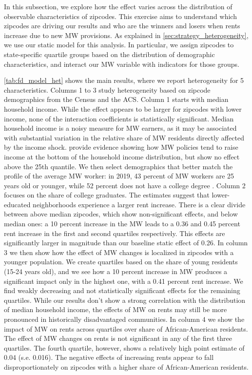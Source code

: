 In this subsection, we explore how the effect varies across the distribution of observable 
characteristics of zipcodes. This exercise aims to understand which zipcodes are driving 
our results and who are the winners and losers when rents increase due to new MW provisions. 
As explained in \autoref{sec:strategy_heterogeneity}, we use our static model for this analysis. 
In particular, we assign zipcodes to state-specific quartile groups based on the distribution of demographic
characteristics, and interact our MW variable with indicators for those groups. 

\autoref{tab:fd_model_het} shows the main results, where we report heterogeneity for 5 
characteristics. Columns 1 to 3 study heterogeneity based on zipcode demographics from the 
Census and the ACS. Column 1 starts with median household income. While the effect appears to 
be larger for zipcodes with lower income, none of the interaction coefficients is statistically 
significant. Median household income is a noisy measure for MW earners, as it may be associated 
with substantial variation in the relative share of MW residents directly affected by the income 
shock. \textcite{dube2019minimum} provide evidence showing how MW policies tend to raise income 
at the bottom of the household income distribution, but show no effect above the 25th quantile. 
We then select demographics that better match the profile of the average MW worker: 
in 2019, 43 percent of MW workers are 25 years old 
or younger, while 52 percent does not have a college degree \parencite{bls2019minworkers}. 
Column 2 focuses on the share of college graduates. The estimates suggest that 
lower-educated neighborhoods experience a larger rent increase. There is a clear divide 
between above median zipcodes, which show non-significant effects, and below median ones:
a 10 percent increase in the  MW leads to a 0.36 and 0.45 percent rent increase in the first and second
quartiles respectively. This effects are significantly larger in magnitude than our baseline static 
effect of 0.26. In column 3 we then show how the effect of MW changes is localized in zipcodes
with a younger population. We create quartiles based on the share of young residents (15-24 years old), 
and we see how a 10 percent increase in MW produces a significant impact only in the highest one, 
with a 0.41 percent rent increase. We find weakly decreasing and not statistically significant effects
for the remaining quartiles. 
While our results don't show a strong correlation with the distribution of median household income, 
the effects of MW on rents may still be more pronounced in historically disadvantaged communities. 
In column 4 we show the impact of MW on rents across quartiles over share of 
African-American residents. The effect of MW changes on rents is not significant in any of the 
first three quartiles. The fourth quartile, however, shows a relatively high point estimate of 
0.04 (s.e. 0.016). The negative effects of increasing rents appear to fall disproportionately 
on zipcodes with a higher share of African-American residents. 

